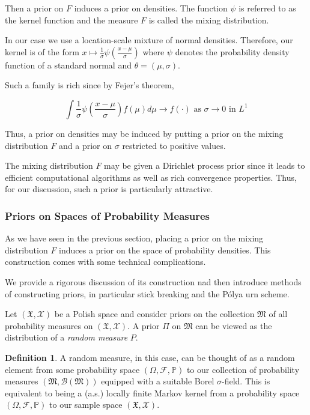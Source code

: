 \documentclass[a4paper,11pt]{article}
\theoremstyle{theorem}
\theoremstyle{definition}
\newtheorem{defn}{Definition}[section]
\theoremstyle{remark}
\begin{document}
Then a prior on $F$ induces a prior on densities. The function $\psi$ is referred to as the kernel function and the measure $F$ is called the mixing distribution. 

In our case we use a location-scale mixture of normal densities. Therefore, our kernel is of the form $x \mapsto \frac{1}{\sigma}\psi\left(\frac{x- \mu}{\sigma}\right)$ where $\psi$ denotes the probability density function of a standard normal and $\theta = (\mu, \sigma)$.

Such a family is rich since by Fejer's theorem,

\[
\int{\frac{1}{\sigma}\psi\left(\frac{x- \mu}{\sigma}\right) f(\mu)d\mu} \to f(\cdot) \text{ as } \sigma \to 0 \text{ in } L^1
\]

Thus, a prior on densities may be induced by putting a prior on the mixing distribution $F$ and a prior on $\sigma$ restricted to positive values.

The mixing distribution $F$ may be given a Dirichlet process prior since it leads to efficient computational algorithms as well as rich convergence properties. Thus, for our discussion, such a prior is particularly attractive. 

\subsubsection{Priors on Spaces of Probability Measures}

As we have seen in the previous section, placing a prior on the mixing distribution $F$ induces a prior on the space of probability densities. This construction comes with some technical complications.

We provide a rigorous discussion of its construction nad then introduce methods of constructing priors, in particular stick breaking and the P\'{o}lya urn scheme.

Let $(\mathfrak{X}, \mathcal{X})$ be a Polish space and consider priors on the collection $\mathfrak{M}$ of all probability measures on $(\mathfrak{X}, \mathcal{X})$. A prior $\Pi$ on $\mathfrak{M}$ can be viewed as the distribution of a \textit{random measure} $P$.

\begin{defn}
A random measure, in this case, can be thought of as a random element from some probability space $(\Omega, \mathcal{F}, \mathbb{P})$ to our collection of probability measures $(\mathfrak{M}, \mathcal{B}(\mathfrak{M}))$ equipped with a suitable Borel $\sigma$-field. This is equivalent to being a (a.s.) locally finite Markov kernel from a probability space $(\Omega, \mathcal{F}, \mathbb{P})$ to our sample space $(\mathfrak{X}, \mathcal{X})$. 
\end{defn} 
\end{document}
